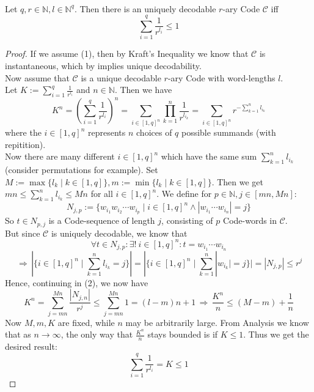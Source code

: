 \documentclass[12pt]{article}
\newenvironment{statement3}[3]{\begin{trivlist}
\item[\hskip \labelsep {\bfseries #1}\hskip \labelsep {\bfseries #2} {#3}\textbf{.}]}{\end{trivlist}}
\begin{document}
\begin{statement3}{(1.7)}{Theorem}{(McMillan's Inequality)}\strut\\[2pt]
    Let $q,r \in \mathbb{N}, l \in \mathbb{N}^q$. Then there is an uniquely decodable
    $r$-ary Code $\mathcal{C}$ iff
    \begin{equation}
        \sum_{i=1}^{q} \frac{1}{r^{l_i}} \leq 1 \tag{1}
    \end{equation}

    \begin{proof}
        If we assume (1), then by Kraft's Inequality we know that $\mathcal{C}$
        is instantaneous, which by \cite{ICT} implies unique decodability.\\[10pt]
        Now assume that $\mathcal{C}$ is a unique decodable $r$-ary Code with word-lengths
        $l$.\\
        Let
        $
            K := \sum_{i=1}^{q} \frac{1}{r^{l_i}}
        $ and $n \in \mathbb{N}$.
        Then we have
        \begin{equation}
            K^n
            = \left(\sum_{i=1}^{q} \frac{1}{r^{l_i}}\right)^n
            = \sum_{i \in [1,q]^n}\prod_{k=1}^{n} \frac{1}{r^{l_{i_k}}}
            = \sum_{i \in [1,q]^n} r^{-\sum_{k=1}^{n} l_{i_k}} \tag{2}
        \end{equation}
        where the $i \in [1,q]^n$ represents $n$ choices of $q$ possible summands (with repitition).\\[10pt]
        Now there are many different $i \in [1,q]^n$ which have the same sum $\sum_{k=1}^{n} l_{i_k}$
        (consider permutations for example). Set $M := \max\{l_k\mid k \in [1,q]\}, m := \min\{l_k \mid k \in [1,q]\}$.
        Then we get $mn \leq \sum_{k=1}^{n} l_{i_k} \leq Mn$ for all $i \in [1,q]^n$. We define for $p \in \mathbb{N},
        j \in [mn,Mn]$:
        $$
            N_{j,p} := \{w_{i_1}w_{i_2}\cdots w_{i_p} \mid i \in [1,q]^n \land |w_{i_1}\cdots w_{i_n}| = j \}
        $$
        So $t \in N_{p,j}$ is a Code-sequence of length $j$, consisting of $p$ Code-words in $\mathcal{C}$.\\
        But since $\mathcal{C}$ is uniquely decodable, we know that
        $$
            \forall t \in N_{j,p}: \exists!\ i \in [1,q]^n: t = w_{i_1}\cdots w_{i_n}
        $$$$
            \,\Longrightarrow\, |\{i \in [1,q]^n \mid \sum_{k=1}^{n} l_{i_k} = j\}|
            = |\{i \in [1,q]^n \mid \sum_{k=1}^{n} |w_{i_k}| = j\}|
            = |N_{j,p}| \leq r^j
        $$
        Hence, continuing in (2), we now have
        $$
            K^n = \sum_{j = mn}^{Mn} \frac{|N_{j,n}|}{r^j} \leq \sum_{j = mn}^{Mn} 1 = (l-m)n + 1
            \,\Longrightarrow\, \frac{K^n}{n} \leq (M-m) + \frac{1}{n}
        $$
        Now $M,m,K$ are fixed, while $n$ may be arbitrarily large. From Analysis we know
        that as $n \to \infty$, the only way that $\frac{K^n}{n}$ stays bounded is if $K \leq 1$.
        Thus we get the desired result:
        $$
            \sum_{i=1}^{q} \frac{1}{r^{l_i}} = K \leq 1
        $$
    \end{proof}
\end{statement3}

\newpage
{}

\end{document}
